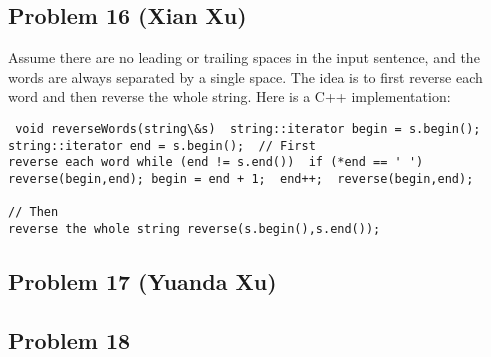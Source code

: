 \documentclass[10pt]{article}
\begin{document}
\subsection*{Problem 16 (Xian Xu)}
Assume there are no leading or trailing spaces in the input sentence, and the words are always separated by a single space. The idea is to first
reverse each word and then reverse the whole string. Here is a C++ implementation: 
\begin{lstlisting} void reverseWords(string\&s)  string::iterator begin = s.begin(); string::iterator end = s.begin();  // First
reverse each word while (end != s.end())  if (*end == ' ')  reverse(begin,end); begin = end + 1;  end++;  reverse(begin,end);

// Then
reverse the whole string reverse(s.begin(),s.end());  \end{lstlisting}

\subsection*{Problem 17 (Yuanda Xu)}

\subsection*{Problem 18}
\end{document}
